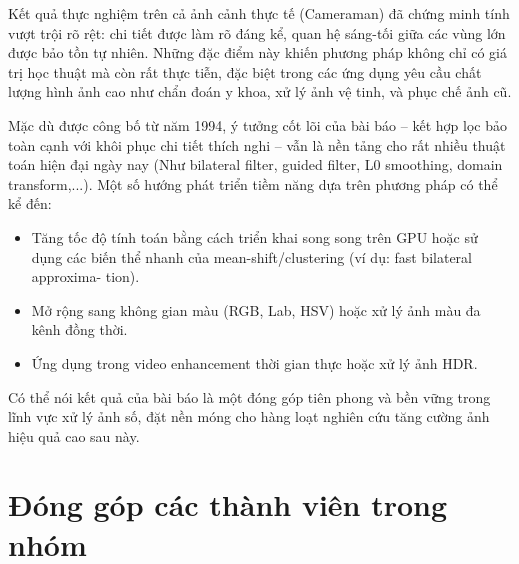 \documentclass[a4paper]{report}
\begin{document}
Kết quả thực nghiệm trên cả ảnh cảnh thực tế (Cameraman) đã chứng minh tính
vượt trội rõ rệt: chi tiết được làm rõ đáng kể, quan hệ sáng-tối giữa các vùng lớn
được bảo tồn tự nhiên. Những đặc điểm này khiến phương pháp không chỉ có giá
trị học thuật mà còn rất thực tiễn, đặc biệt trong các ứng dụng yêu cầu chất lượng
hình ảnh cao như chẩn đoán y khoa, xử lý ảnh vệ tinh, và phục chế ảnh cũ.

Mặc dù được công bố từ năm 1994, ý tưởng cốt lõi của bài báo -- kết hợp lọc bảo
toàn cạnh với khôi phục chi tiết thích nghi -- vẫn là nền tảng cho rất nhiều thuật
toán hiện đại ngày nay (Như bilateral filter, guided filter, L0 smoothing, domain
transform,...). Một số hướng phát triển tiềm năng dựa trên phương pháp có thể kể
đến:

\begin{itemize}
    \item Tăng tốc độ tính toán bằng cách triển khai song song trên GPU hoặc sử dụng
          các biến thể nhanh của mean-shift/clustering (ví dụ: fast bilateral approxima-
          tion).
    \item Mở rộng sang không gian màu (RGB, Lab, HSV) hoặc xử lý ảnh màu đa kênh
          đồng thời.
    \item Ứng dụng trong video enhancement thời gian thực hoặc xử lý ảnh HDR.
\end{itemize}

Có thể nói kết quả của bài báo là một đóng góp tiên phong và bền vững trong lĩnh
vực xử lý ảnh số, đặt nền móng cho hàng loạt nghiên cứu tăng cường ảnh hiệu quả
cao sau này.

\chapter*{Đóng góp các thành viên trong nhóm}
\end{document}

